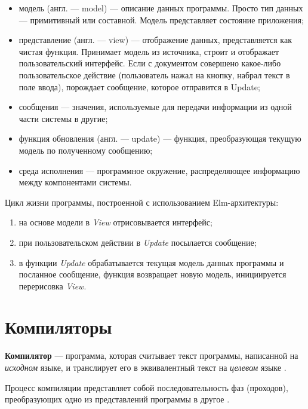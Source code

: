 \begin{itemize}
    \item модель (англ. --- model) --- описание данных программы. Просто тип данных --- примитивный или составной. Модель представляет состояние приложения;
    \item представление (англ. --- view) --- отображение данных, представляется как чистая функция. Принимает модель из источника, строит и отображает пользовательский интерфейс.
    Если с документом совершено какое-либо пользовательское действие (пользователь нажал на кнопку, набрал текст в поле ввода), порождает сообщение, которое отправится в Update;
    \item сообщения --- значения, используемые для передачи информации из одной части системы в другие;
    \item функция обновления (англ. --- update) --- функция, преобразующая текущую модель по полученному сообщению;
    \item среда исполнения --- программное окружение, распределяющее информацию между компонентами системы.
\end{itemize}

Цикл жизни программы, построенной с использованием Elm-архитектуры:

\begin{enumerate}
    \item на основе модели в \textit{View} отрисовывается интерфейс;
    \item при пользовательском действии в \textit{Update} посылается сообщение;
    \item в функции \textit{Update} обрабатывается текущая модель данных программы и посланное сообщение, функция возвращает новую модель, инициируется перерисовка \textit{View}. \cite{elminaction}
\end{enumerate}

\FloatBarrier

\section{Компиляторы}\label{sec:ch1/sec5}

\textbf{Компилятор} --- программа, которая считывает текст программы, написанной
на \textit{исходном} языке, и транслирует его в эквивалентный текст на
\textit{целевом} языке \cite[с.~29]{dragonbook}.

Процесс компиляции представляет собой последовательность фаз (проходов),
преобразующих одно из представлений программы в другое \cite[с.~33]{dragonbook}.

